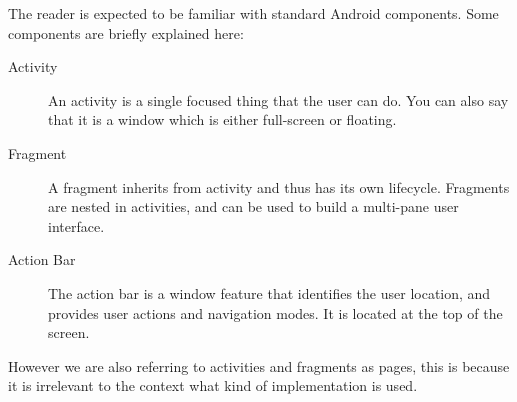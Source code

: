 
The reader is expected to be familiar with standard Android components. Some components are briefly explained here:
\begin{description}
\item[Activity] An activity is a single focused thing that the user can do. You can also say that it is a window which is either full-screen or floating. \citep{activity}
\item[Fragment] A fragment inherits from activity and thus has its own lifecycle. Fragments are nested in activities, and can be used to build a multi-pane user interface. \citep{fragment}
\item[Action Bar] The action bar is a window feature that identifies the user location, and provides user actions and navigation modes. It is located at the top of the screen. \citep{actionbar}
\end{description}

However we are also referring to activities and fragments as pages, this is because it is irrelevant to the context what kind of implementation is used.